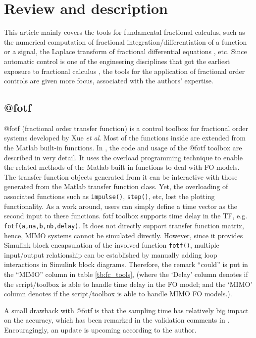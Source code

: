 \documentclass[11pt]{tCON2e}
\theoremstyle{plain}\newtheorem{theorem}{Theorem}
\theoremstyle{definition}
\theoremstyle{remark}
\begin{document}
\section{Review and description}
\label{sec:review}

This article mainly covers the tools for fundamental fractional calculus, such as the numerical computation of fractional integration/differentiation of a function or a signal, the Laplace transform of fractional differential equations \cite{ref:Igor}, etc. Since automatic control is one of the engineering disciplines that got the earliest exposure to fractional calculus \cite{ref:Bode_book, ref:Bagley, ref:Axtell, ref:Igor_FOPID_1999}, the tools for the application of fractional order controls are given more focus, associated with the authors' expertise.

\subsection{@fotf}
@fotf (fractional order transfer function) is a control toolbox for fractional order systems developed by Xue \emph{et al}. Most of the functions inside are extended from the Matlab built-in functions. In \cite{ref:Chen_tutorial}, the code and usage of the @fotf toolbox are described in very detail. It uses the overload programming technique to enable the related methods of the Matlab built-in functions to deal with FO models. The transfer function objects generated from it can be interactive with those generated from the Matlab transfer function class. Yet, the overloading of associated functions such as {\tt impulse()}, {\tt step()}, etc, lost the plotting functionality. As a work around, users can simply define a time vector as the second input to these functions. fotf toolbox supports time delay in the TF, e.g. {\tt fotf(a,na,b,nb,delay)}. It does not directly support transfer function matrix, hence, MIMO systems cannot be simulated directly. However, since it provides Simulink block encapsulation of the involved function {\tt fotf()}, multiple input/output relationship can be established by manually adding loop interactions in Simulink block diagrams. Therefore, the remark ``could'' is put in the ``MIMO'' column in table \ref{tb:fc_tools}, (where the `Delay' column denotes if the script/toolbox is able to handle time delay in the FO model; and the `MIMO' column denotes if the script/toolbox is able to handle MIMO FO models.).

A small drawback with @fotf is that the sampling time has relatively big impact on the accuracy, which has been remarked in the validation comments in \cite{ref:Chen_tutorial}.
Encouragingly, an update is upcoming according to the author.
\end{document}
